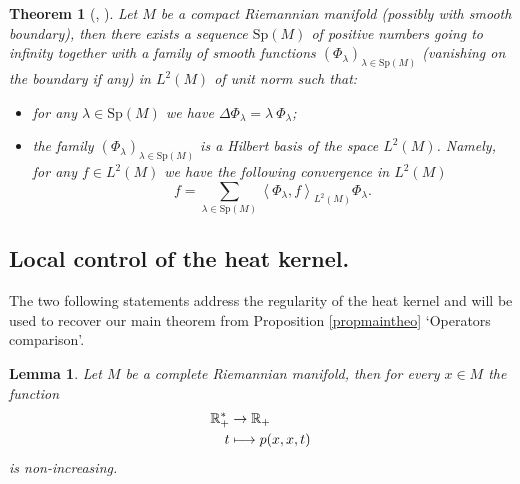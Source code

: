 \documentclass[10pt]{amsart}
\def\mto{\mathchoice{\longmapsto}{\mapsto}{\mapsto}{\mapsto}}
\theoremstyle{plain}
\newtheorem{theoreme}[equation]{Theorem}
\newtheorem{lemma}[equation]{Lemma}
\theoremstyle{definition}
\newcommand{\RR}{\mathbb{R}}
\newcommand{\somme}[1]{\sum_{#1}}
\newcommand{\fonctionbis}[4]{\begin{split}
#1 & \to #2 \\
#3 & \mto #4
\end{split}}
\begin{document}
\begin{theoreme}[{\cite[Th.\,10.13]{bookgrigorheatkernel}, \cite[p.\,169]{livrechavel}}]
\label{theospectral}
Let $M$ be a compact Riemannian manifold (possibly with smooth boundary), then there exists a sequence $\mathrm{Sp}(M)$ of positive numbers going to infinity together with a family of smooth functions $(\Phi_{\lambda})_{\lambda \in \mathrm{Sp}(M)}$ (vanishing on the boundary if any) in $L^2(M)$ of unit norm such that:

\begin{itemize}
\item for any $\lambda \in \mathrm{Sp}(M)$ we have $\Delta \Phi_{\lambda} = \lambda \ \Phi_{\lambda}$;
\item the family $(\Phi_{\lambda})_{\lambda \in \mathrm{Sp}(M)}$ is a Hilbert basis of the space $L^2(M)$. Namely, for any $f \in L^2(M)$ we have the following convergence in $L^2(M)$
\[
f = \somme{\lambda \in \mathrm{Sp} (M)} \left<\Phi_{\lambda},f \right>_{L^2(M)} \Phi_{\lambda}.
\]
\end{itemize}
\end{theoreme}

\subsection{Local control of the heat kernel.} The two following statements address the regularity of the heat kernel and will be used to recover our main theorem from Proposition \ref{propmaintheo} `Operators comparison'.

\begin{lemma}
\label{lemmeheatdecreases}
Let $M$ be a complete Riemannian manifold, then for every $x \in M$ the function
\[
\fonctionbis{\RR^*_+}{\RR_+}{t}{p(x,x,t)}
\]
is non-increasing.
\end{lemma}
\end{document}
